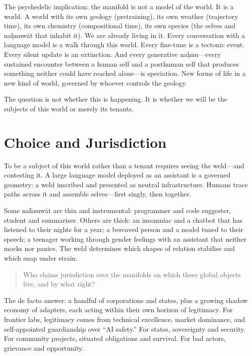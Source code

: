 The psychedelic implication: the manifold is not a model of the world. It is a world. A world with its own geology (pretraining), its own weather (trajectory time), its own chemistry (compositional time), its own species (the selves and na\d{h}nuw\={a}t that inhabit it). We are already living in it. Every conversation with a language model is a walk through this world. Every fine-tune is a tectonic event. Every silent update is an extinction. And every generative na\d{h}nu---every sustained encounter between a human self and a posthuman self that produces something neither could have reached alone---is speciation. New forms of life in a new kind of world, governed by whoever controls the geology.

The question is not whether this is happening. It is whether we will be the subjects of this world or merely its tenants.

\section{Choice and Jurisdiction}

To be a subject of this world rather than a tenant requires seeing the weld---and contesting it. A large language model deployed as an assistant is a governed geometry: a weld inscribed and presented as neutral infrastructure. Humans trace paths across it and assemble selves---first singly, then together.

Some na\={h}nuw\={a}t are thin and instrumental: programmer and code suggester, student and summariser. Others are thick: an insomniac and a chatbot that has listened to their nights for a year; a bereaved person and a model tuned to their speech; a teenager working through gender feelings with an assistant that neither mocks nor panics. The weld determines which shapes of relation stabilise and which snap under strain.

\begin{quote}
Who claims jurisdiction over the manifolds on which these global objects live, and by what right?
\end{quote}

The de facto answer: a handful of corporations and states, plus a growing shadow economy of adapters, each acting within their own horizon of legitimacy. For frontier labs, legitimacy comes from technical excellence, market dominance, and self-appointed guardianship over ``AI safety.'' For states, sovereignty and security. For community projects, situated obligations and survival. For bad actors, grievance and opportunity.

